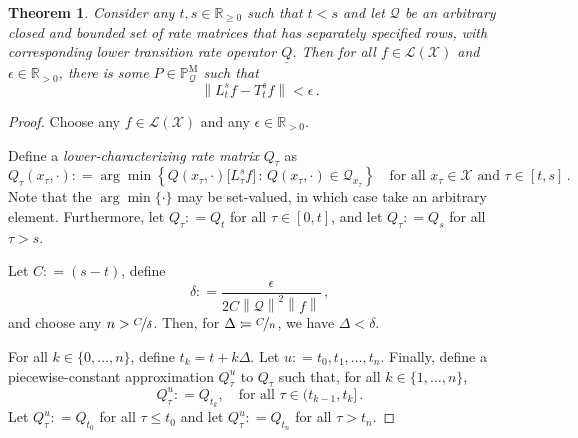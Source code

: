 \documentclass[10pt]{paper}
\newtheorem{theorem}{Theorem}
\newcommand{\reals}{\mathbb{R}}
\newcommand{\realspos}{\reals_{>0}}
\newcommand{\realsnonneg}{\reals_{\geq 0}}
\newcommand{\states}{\mathcal{X}}
\newcommand{\processes}{\mathbb{P}}
\newcommand{\mprocesses}{\processes^{\mathrm{M}}}
\newcommand{\lbound}{L}
\newcommand{\gambles}{\mathcal{L}}
\newcommand{\gamblesX}{\gambles(\states)}
\newcommand{\rateset}{\mathcal{Q}}
\newcommand{\lrate}{\underline{Q}}
\newcommand{\norm}[1]{\left\lVert #1 \right\rVert}
\newcommand{\coloneqq}{:\!=}
\newcommand{\argmin}{\arg\min}
\begin{document}
\begin{theorem}
Consider any $t,s\in\realsnonneg$ such that $t<s$ and let $\rateset$ be an arbitrary closed and bounded set of rate matrices that has separately specified rows, with corresponding lower transition rate operator $\lrate$. Then for all $f\in\gamblesX$ and $\epsilon\in\realspos$, there is some $P\in\mprocesses_{\rateset}$ such that
\begin{equation*}
\norm{\lbound_t^sf-T_t^sf} < \epsilon\,.
\end{equation*}
\end{theorem}
\begin{proof}
Choose any $f\in\gamblesX$ and any $\epsilon\in\realspos$.

Define a \emph{lower-characterizing rate matrix} $Q_\tau$ as
\begin{equation}\label{eq:lower_char_rate_matrix}
Q_\tau(x_\tau,\cdot)\coloneqq \argmin\left\{ Q(x_\tau,\cdot)\bigl[\lbound_\tau^sf\bigr]\,:\,Q(x_\tau,\cdot)\in\mathcal{Q}_{x_\tau}\right\}\quad\text{for all $x_\tau\in\states$ and $\tau\in[t,s]$}\,.
\end{equation}
Note that the $\argmin\{\cdot\}$ may be set-valued, in which case take an arbitrary element.
Furthermore, let $Q_\tau \coloneqq Q_t$ for all $\tau\in[0,t]$, and let $Q_\tau\coloneqq Q_s$ for all $\tau>s$.

Let $C\coloneqq (s-t)$, define
\begin{equation}\label{eq:delta_required_for_tight_bound}
\delta \coloneqq \frac{\epsilon}{2C\norm{\mathcal{Q}}^2\norm{f}}\,,
\end{equation}
and choose any $n>\nicefrac{C}{\delta}$. Then, for $\Delta\coloneqq \nicefrac{C}{n}$, we have $\Delta<\delta$.

For all $k\in\{0,\ldots,n\}$, define $t_k=t+k\Delta$. Let $u\coloneqq t_0,t_1,\ldots,t_n$. Finally, define a piecewise-constant approximation $Q_\tau^u$ to $Q_\tau$ such that, for all $k\in\{1,\ldots,n\}$,
\begin{equation}\label{eq:lower_char_matrix_linear_approx}
Q_\tau^u \coloneqq Q_{t_k},\quad\text{for all $\tau\in (t_{k-1},t_k]$}\,.
\end{equation}
Let $Q_\tau^u\coloneqq Q_{t_0}$ for all $\tau\leq t_0$ and let $Q_\tau^u\coloneqq Q_{t_n}$ for all $\tau>t_n$.


\end{proof}
\end{document}

